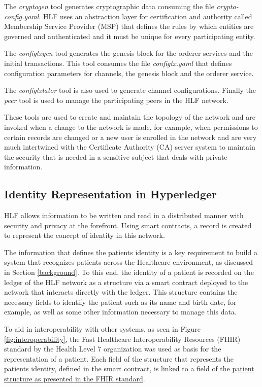 \documentclass[]{llncs}
\begin{document}
The \textit{cryptogen} tool generates cryptographic data consuming the file \textit{crypto-config.yaml}. 
HLF uses an abstraction layer for certification and authority called Membership Service Provider (MSP) 
that defines the rules by which entities are governed and authenticated and 
it must be unique for every participating entity.

The \textit{configtxgen} tool generates the genesis block for the orderer services and the initial transactions. 
This tool consumes the file \textit{configtx.yaml} that defines configuration parameters 
for channels, the genesis block and the orderer service.

The \textit{configtxlator} tool is also used to generate channel configurations. 
Finally the \textit{peer} tool is used to manage the participating peers in the HLF network.

These tools are used to create and maintain the topology of the network and are invoked when a change 
to the network is made, for example, when permissions to certain records are changed or a new user is
enrolled in the network and are very much intertwined with the Certificate Authority (CA) server system
to maintain the security that is needed in a sensitive subject that deals with private information.

\subsection{Identity Representation in Hyperledger}
 
HLF allows information to be written and read in a distributed manner with security and
privacy at the forefront. Using smart contracts, a record is created to represent the concept of 
identity in this network.

The information that defines the patients identity is a key requirement to build a
system that recognizes patients across the Healthcare environment, as discussed in 
Section \ref{background}. 
To this end, the identity of a patient is recorded on the ledger of the HLF network
as a structure via a smart contract deployed to the network that interacts directly with the ledger. 
This structure contains the necessary fields to identify the patient
such as its name and birth date, for example, as well as some other information
necessary to manage this data. 

To aid in interoperability with other systems, as seen in Figure \ref{fig:interoperability}, the Fast Healthcare Interoperability Resources (FHIR) 
standard by the Health Level 7 organization was used as basis for the representation of a patient. 
Each field of the structure that represents the patients identity, defined in the smart contract, 
is linked to a field of the \href{http://www.hl7.org/fhir/patient.html}{patient structure as presented in the FHIR standard}.
\end{document}
